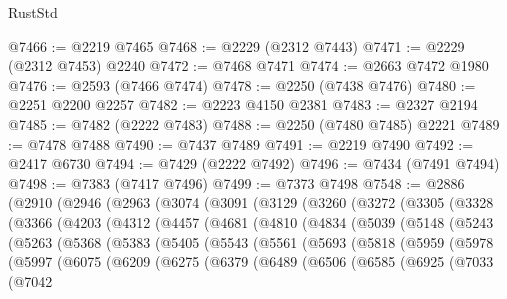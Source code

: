 \begin{lexlean}{RustStd}
\begin{coremodule}
@7466 := @2219 @7465
@7468 := @2229 (@2312 @7443)
@7471 := @2229 (@2312 @7453) @2240
@7472 := @7468 @7471
@7474 := @2663 @7472 @1980
@7476 := @2593 (@7466 @7474)
@7478 := @2250 (@7438 @7476)
@7480 := @2251 @2200 @2257
@7482 := @2223 @4150 @2381
@7483 := @2327 @2194
@7485 := @7482 (@2222 @7483)
@7488 := @2250 (@7480 @7485) @2221
@7489 := @7478 @7488
@7490 := @7437 @7489
@7491 := @2219 @7490
@7492 := @2417 @6730
@7494 := @7429 (@2222 @7492)
@7496 := @7434 (@7491 @7494)
@7498 := @7383 (@7417 @7496)
@7499 := @7373 @7498
@7548 := @2886
    (@2910
      (@2946
        (@2963
          (@3074
            (@3091
              (@3129
                (@3260
                  (@3272
                    (@3305
                      (@3328
                        (@3366
                          (@4203
                            (@4312
                              (@4457
                                (@4681
                                  (@4810
                                    (@4834
                                      (@5039
                                        (@5148
                                          (@5243
                                            (@5263
                                              (@5368
                                                (@5383
                                                  (@5405
                                                    (@5543
                                                      (@5561
                                                        (@5693
                                                          (@5818
                                                            (@5959
                                                              (@5978
                                                                (@5997
                                                                  (@6075
                                                                    (@6209
                                                                      (@6275
                                                                        (@6379
                                                                          (@6489
                                                                            (@6506
                                                                              (@6585
                                                                                (@6925
                                                                                  (@7033
                                                                                    (@7042

\end{coremodule}
\end{lexlean}
